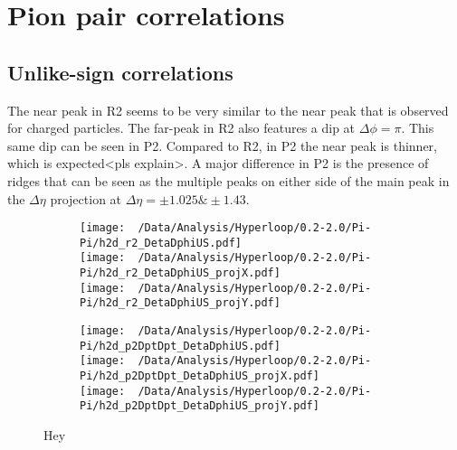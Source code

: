 \documentclass[12pt,a4paper,twoside]{report}
\begin{document}
\section{Pion pair correlations}
\subsection{Unlike-sign correlations}
The near peak in R2 seems to be very similar to the near peak that is observed for charged particles. The far-peak in R2 also features a dip at $\Delta\phi=\pi$.
This same dip can be seen in P2. Compared to R2, in P2 the near peak is thinner, which is expected<pls explain>. A major difference in P2 is the presence of ridges that can be seen as the multiple peaks on either side of the main peak in the $\Delta\eta$ projection at $\Delta\eta=\pm1.025\&\pm1.43$.
\begin{figure}[H]
	\begin{subfigure}{0.49\linewidth}
		\texttt{[image: ~/Data/Analysis/Hyperloop/0.2-2.0/Pi-Pi/h2d\_r2\_DetaDphiUS.pdf]}\\
		\texttt{[image: ~/Data/Analysis/Hyperloop/0.2-2.0/Pi-Pi/h2d\_r2\_DetaDphiUS\_projX.pdf]}\\
		\texttt{[image: ~/Data/Analysis/Hyperloop/0.2-2.0/Pi-Pi/h2d\_r2\_DetaDphiUS\_projY.pdf]}\\
	\end{subfigure}
	\begin{subfigure}{0.49\linewidth}
		\texttt{[image: ~/Data/Analysis/Hyperloop/0.2-2.0/Pi-Pi/h2d\_p2DptDpt\_DetaDphiUS.pdf]}\\
		\texttt{[image: ~/Data/Analysis/Hyperloop/0.2-2.0/Pi-Pi/h2d\_p2DptDpt\_DetaDphiUS\_projX.pdf]}\\
		\texttt{[image: ~/Data/Analysis/Hyperloop/0.2-2.0/Pi-Pi/h2d\_p2DptDpt\_DetaDphiUS\_projY.pdf]}\\
	\end{subfigure}
	\caption{Hey}
\end{figure}
\end{document}
